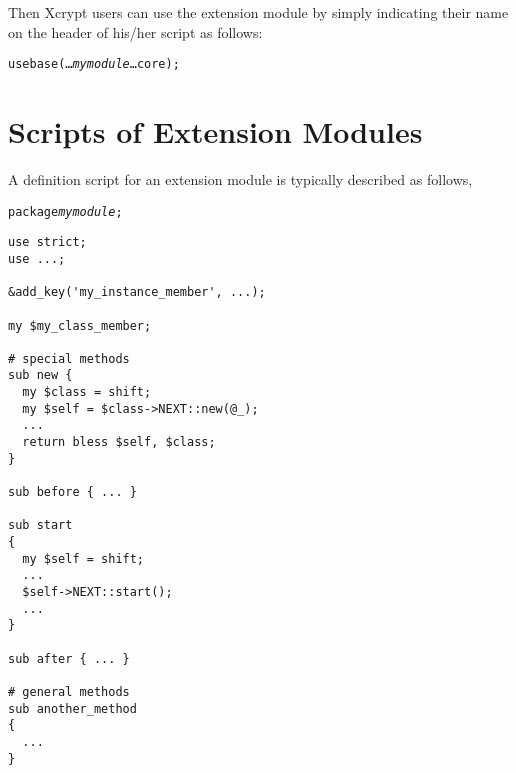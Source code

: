 \documentclass[a4paper,10pt]{report}
\begin{document}
Then Xcrypt users can use the extension module by simply indicating
their name on the header of his/her script as follows:
\begin{screen}
\begin{alltt}
use base (\ldots {\it mymodule} \ldots core);
\end{alltt}
\end{screen}


\section{Scripts of Extension Modules}

A definition script for an extension module is typically described as follows,
\begin{boxnote}
  \begin{alltt}
package {\it mymodule};
  \end{alltt}
\begin{verbatim}
use strict;
use ...;

&add_key('my_instance_member', ...);

my $my_class_member;

# special methods
sub new {
  my $class = shift;
  my $self = $class->NEXT::new(@_);
  ... 
  return bless $self, $class;
}

sub before { ... }

sub start
{
  my $self = shift;
  ...
  $self->NEXT::start();
  ...
}

sub after { ... }

# general methods
sub another_method
{
  ...
}
\end{verbatim}
\end{boxnote}
\vspace{\baselineskip}
\end{document}
